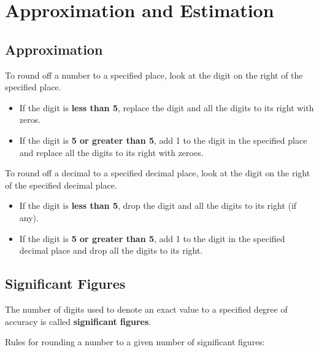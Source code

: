 \documentclass[../main]{subfiles}
\begin{document}
\section{Approximation and Estimation}

\subsection{Approximation}

To round off a number to a specified place, look at the digit on the right of
the specified place.

\begin{itemize}
\item If the digit is \textbf{less than 5}, replace the digit and all the digits
  to its right with zeros.
\item If the digit is \textbf{5 or greater than 5}, add 1 to the digit in the
  specified place and replace all the digits to its right with zeroes.
  
\end{itemize}

To round off a decimal to a specified decimal place, look at the digit on the
right of the specified decimal place.
\begin{itemize}
\item If the digit is \textbf{less than 5}, drop the digit and all the digits to
  its right (if any).
\item If the digit is \textbf{5 or greater than 5}, add 1 to the digit in the
  specified decimal place and drop all the digits to its right.
\end{itemize}

\subsection{Significant Figures}
The number of digits used to denote an exact value to a specified degree of
accuracy is called \textbf{significant figures}.

Rules for rounding a number to a given number of significant figures:
\end{document}
